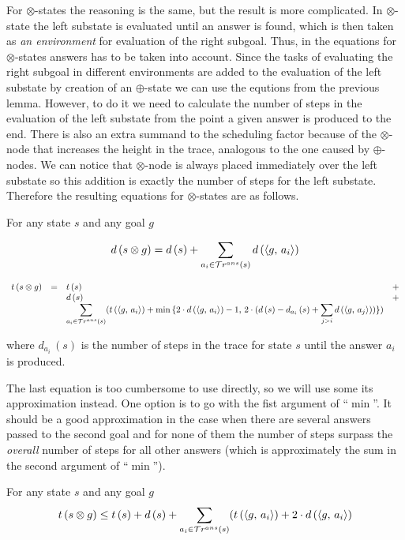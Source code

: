 For $\otimes$-states the reasoning is the same, but the result is more complicated. In $\otimes$-state the left substate is evaluated until an answer is found, which is then taken as
\emph{an environment} for evaluation of the right subgoal. Thus, in the equations for $\otimes$-states answers
has to be taken into account. Since the tasks of evaluating the right subgoal in different environments are added to the evaluation of the left substate by creation of an $\oplus$-state
we can use the equtions from the previous lemma. However, to do it we need to calculate the number of steps in the evaluation of the left substate from the point a given answer is produced
to the end. There is also an extra summand to the scheduling factor because of the $\otimes$-node that increases the height in the trace, analogous to the one caused by $\oplus$-nodes.
We can notice that $\otimes$-node is always placed immediately over the left substate so this addition is exactly the number of steps for the left substate. Therefore the resulting
equations for $\otimes$-states are as follows.

\begin{lemma}
For any state $s$ and any goal $g$

\[
d\,(s \otimes g) = d\,(s) + \displaystyle\sum\limits_{a_i \in \mathcal{T}r^{ans}(s)} d\,(\langle g ,\, a_i \rangle)
\]

\[
\begin{array}{rclc}
  t\,(s \otimes g) &=& t\,(s) & + \\
                   & & d\,(s) & + \\
  & & \displaystyle\sum\limits_{a_i \in \mathcal{T}r^{ans}(s)} (t\,(\langle g ,\, a_i \rangle) + \min\,\{2\cdot d\,(\langle g ,\, a_i \rangle) - 1,\,2\cdot (d\,(s) - d_{a_i}\,(s) + \displaystyle\sum\limits_{j > i} d\,(\langle g ,\, a_j \rangle))\})
\end{array}
\]

where $d_{a_i}\,(s)$ is the number of steps in the trace for state $s$ until the answer $a_i$ is produced.
\end{lemma}

The last equation is too cumbersome to use directly, so we will use some its approximation instead. One option is to go with the fist argument of ``$\min$''. It should be a good approximation
in the case when there are several answers passed to the second goal and for none of them the number of steps surpass the \emph{overall} number of steps for all other answers (which is approximately the sum in the second argument of ``$\min$'').

\begin{corollary}
\label{lem:prod_estimation_multiple_answers}
For any state $s$ and any goal $g$
\[ t\,(s \otimes g) \le t\,(s) + d\,(s) +  \displaystyle\sum\limits_{a_i \in \mathcal{T}r^{ans}(s)} (t\,(\langle g ,\, a_i \rangle) + 2\cdot d\,(\langle g ,\, a_i \rangle) \]
\end{corollary}


